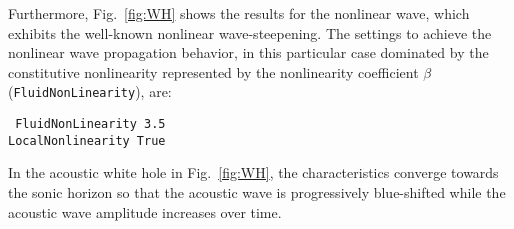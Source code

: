 Furthermore, Fig.~\ref{fig:WH} shows the results for the nonlinear wave, which exhibits the well-known nonlinear wave-steepening. The settings to achieve the nonlinear wave propagation behavior, in this particular case dominated by the constitutive nonlinearity represented by the nonlinearity coefficient $\beta$ ({\tt FluidNonLinearity}), are:

    {\tt
        FluidNonLinearity 3.5 \\
        LocalNonlinearity True
    }

In the acoustic white hole in Fig.~\ref{fig:WH}, the characteristics converge towards the sonic horizon so that the acoustic wave is progressively blue-shifted while the acoustic wave amplitude increases over time.

\begin{figure*}
    \caption{Example of an acoustic black hole.}
    \label{fig:BH}
\end{figure*}


\begin{figure*}
    \caption{Example of an acoustic white hole.}
    \label{fig:WH}
\end{figure*}



